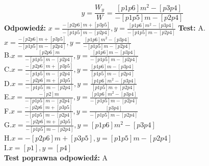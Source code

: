 \documentclass[12pt, a4paper]{article}
\theoremstyle{definition} %
\newcommand{\rozwStop}{\newline}                                            %
\newcommand{\odpStart}{\noindent \textbf{Odpowiedź:}\newline}    %
\newcommand{\odpStop}{\newline}                                             %
\newcommand{\testStart}{\noindent \textbf{Test:}\newline} %
\newcommand{\testStop}{\newline} %
\newcommand{\kluczStart}{\noindent \textbf{Test poprawna odpowiedź:}\newline} %
\newcommand{\kluczStop}{\newline} %
\begin{document}
$$y=\frac{W_{y}}{W}=\frac{[p1p6]m^{2}-[p3p4]}{-[p1p5]m-[p2p4]}$$
\rozwStop
\odpStart
$x=\frac{-[p2p6]m+[p3p5]}{-[p1p5]m-[p2p4]}, y=\frac{[p1p6]m^{2}-[p3p4]}{-[p1p5]m-[p2p4]}$
\odpStop
\testStart
A.$x=\frac{-[p2p6]m+[p3p5]}{-[p1p5]m-[p2p4]}, y=\frac{[p1p6]m^{2}-[p3p4]}{-[p1p5]m-[p2p4]}$\\
B.$x=\frac{[p2p6]m}{-[p1p5]m-[p2p4]}, y=\frac{[p1p6]m-[p3p4]}{-[p1p5]m-[p2p4]}$\\
C.$x=\frac{-[p2p6]m+[p3p5]}{-[p1p5]m-[p2p4]}, y=\frac{[p1p6]m-[p3p4]}{[p1p5]m-[p2p4]}$\\
D.$x=\frac{-[p2p6]m+[p3p5]}{-[p1p5]m-[p2p4]}, y=\frac{[p1p6]m^{2}-[p3p4]}{[p1p5]m+[p2p4]}$\\
E.$x=\frac{-[p2]m}{-[p1p5]m-[p2p4]}, y=\frac{[p1p6]m^{2}-[p3p4]}{-[p1p5]m-[p2p4]}$\\
F.$x=\frac{-[p2p6]m+[p3p5]}{-[p1p5]m-[p2p4]}, y=\frac{[p3p4]}{-[p1p5]m-[p2p4]}$\\
G.$x=\frac{-[p2p6]m+[p3p5]}{-[p1p5]m-[p2p4]}, y=[p1p6]m^{2}-[p3p4]$\\
H.$x=-[p2p6]m+[p3p5], y=[p1p5]m-[p2p4]$\\
I.$x=[p1], y=[p4]$\\
\testStop
\kluczStart
A
\kluczStop
\end{document}
